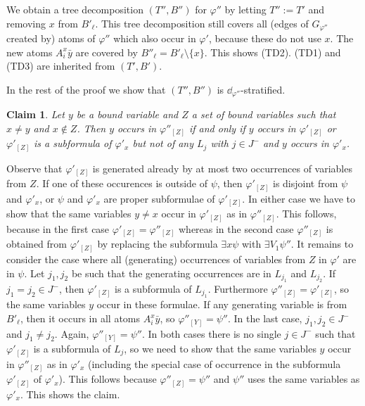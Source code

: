 \documentclass{LMCS}
\newtheorem{clam}{Claim}
\renewcommand{\phi}{\varphi}
\begin{document}
We obtain a tree decomposition $(T'',B'')$ for $\phi''$ by letting
$T'':=T'$ and removing $x$ from $B'_{\ell}$. 
This tree decomposition still covers all 
(edges of $G_{\phi''}$ created by) atoms of $\phi''$ 
which also occur in $\phi'$, because these do not use $x$. 
The new atoms $A_i^x\bar y$ are covered by $B''_{\ell}=B'_{\ell}\setminus\{x\}$. 
This shows (TD2).
(TD1) and (TD3) are inherited from $(T',B')$. 

In the rest of the proof we show that $(T'',B'')$ 
is $\dd_{\phi''}$-stratified. 

\begin{clam}\label{claim:entanglement phi' vs phi''}
Let $y$ be a bound variable and $Z$ a set of bound variables 
such that $x\not=y$ and $x\not\in Z$. 
Then $y$ occurs in $\phi''_{[Z]}$ 
if and only if $y$ occurs in $\phi'_{[Z]}$ 
or $\phi'_{[Z]}$ is a subformula of $\phi'_x$ 
but not of any $L_j$ with $j\in J^-$ 
and $y$ occurs in $\phi'_x$. 
\end{clam}

\proof
Observe that $\phi'_{[Z]}$ is generated 
already by at most two occurrences of variables from $Z$. 
If one of these occurences is outside of $\psi$, 
then $\phi'_{[Z]}$ is disjoint from $\psi$ and $\phi'_x$, 
or $\psi$ and $\phi'_x$ are proper subformulae of $\phi'_{[Z]}$. 
In either case we have to show 
that the same variables $y\not=x$ occur in $\phi'_{[Z]}$ as in $\phi''_{[Z]}$. 
This follows, because in the first case $\phi'_{[Z]}=\phi''_{[Z]}$ 
whereas in the second case $\phi''_{[Z]}$ is obtained from $\phi'_{[Z]}$ 
by replacing the subformula $\exists x\psi$ with $ \exists V_1\psi''$. 
It remains to consider the case 
where all (generating) occurrences of variables from $Z$ in $\phi'$ 
are in $\psi$. 
Let $j_1,j_2$ be such 
that the generating occurrences are in $L_{j_1}$ and $L_{j_2}$. 
If $j_1=j_2\in J^-$, 
then $\phi'_{[Z]}$ is a subformula of $L_{j_1}$. 
Furthermore $\phi''_{[Z]}=\phi'_{[Z]}$, 
so the same variables $y$ occur in these formulae. 
If any generating variable is from $B'_{\ell}$, 
then it occurs in all atoms $A_i^x\bar y$, 
so $\phi''_{[Y]}=\psi''$. 
In the last case, $j_1,j_2\in J^-$ and $j_1\not=j_2$. 
Again, $\phi''_{[Y]}=\psi''$. 
In both cases there is no single $j\in J^-$ 
such that $\phi'_{[Z]}$ is a subformula of $L_j$, 
so we need to show that the same variables $y$ 
occur in $\phi''_{[Z]}$ as in $\phi'_x$ 
(including the special case of occurrence 
in the subformula  $\phi'_{[Z]}$ of $\phi'_x$). 
This follows because $\phi''_{[Z]}=\psi''$ 
and $\psi''$ uses the same variables as $\phi'_x$. 
This shows the claim. 
\cqed
\end{document}
